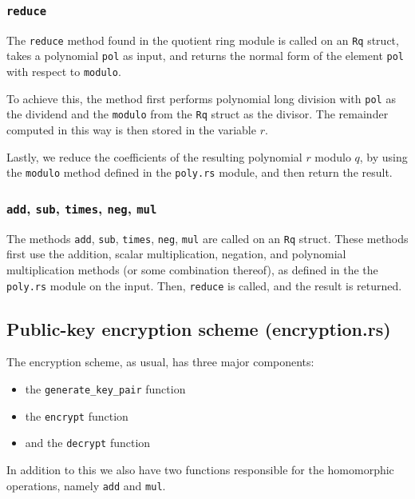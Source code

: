 \documentclass[../main.tex]{subfiles}
\begin{document}
\subsubsection{\lstinline{reduce}}

The \lstinline{reduce} method found in the quotient ring module is called on an \lstinline{Rq} struct, takes a polynomial \lstinline{pol} as input, and returns the normal form of the element \lstinline{pol} with respect to \lstinline{modulo}.

To achieve this, the method first performs polynomial long division with \lstinline{pol} as the dividend and the \lstinline{modulo} from the \lstinline{Rq} struct as the divisor. The remainder computed in this way is then stored in the variable $r$.

Lastly, we reduce the coefficients of the resulting polynomial $r$ modulo $q$, by using the \lstinline{modulo} method defined in the \lstinline{poly.rs} module, and then return the result.

\subsubsection{\lstinline{add}, \lstinline{sub}, \lstinline{times}, \lstinline{neg}, \lstinline{mul}}

The methods \lstinline{add}, \lstinline{sub}, \lstinline{times}, \lstinline{neg}, \lstinline{mul} are called on an \lstinline{Rq} struct.
These methods first use the addition, scalar multiplication, negation, and polynomial multiplication methods (or some combination thereof), as defined in the the \lstinline{poly.rs} module on the input.
Then, \lstinline{reduce} is called, and the result is returned.

\subsection{Public-key encryption scheme (encryption.rs)}

The encryption scheme, as usual, has three major components:

\begin{itemize}
  \item the \lstinline{generate_key_pair} function
  \item the \lstinline{encrypt} function
  \item and the \lstinline{decrypt} function
\end{itemize}

In addition to this we also have two functions responsible for the homomorphic operations, namely \lstinline{add} and \lstinline{mul}.
\end{document}
